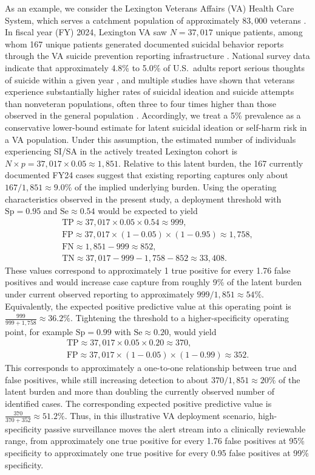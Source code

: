 \documentclass[onecolumn, compsoc,11pt]{IEEEtran}
\def\EQSP{3pt}
\newcommand{\cgather}[2][\EQSP]{\begingroup\setlength\abovedisplayskip{#1}\setlength\belowdisplayskip{#1}\begin{gather} #2 \end{gather}\endgroup\noindent}
\begin{document}
As an example, we consider the Lexington Veterans Affairs (VA) Health Care System, which serves a catchment population of approximately $83{,}000$ veterans \cite{VA_Lexington_About}. In fiscal year (FY) 2024, Lexington VA saw $N = 37{,}017$ unique patients, among whom 167 unique patients generated documented suicidal behavior reports through the VA suicide prevention reporting infrastructure \cite{VA_VINCI_Lexington_2024}. National survey data indicate that approximately 4.8\% to 5.0\% of U.S.\ adults report serious thoughts of suicide within a given year \cite{SAMHSA_2023_NSduh}, and multiple studies have shown that veterans experience substantially higher rates of suicidal ideation and suicide attempts than nonveteran populations, often three to four times higher than those observed in the general population \cite{NHRVS_Suicide_Ideation,VA_Suicide_Report_2023}. Accordingly, we treat a 5\% prevalence as a conservative lower-bound estimate for latent suicidal ideation or self-harm risk in a VA population. Under this assumption, the estimated number of individuals experiencing SI/SA in the actively treated Lexington cohort is
$ N \times p = 37{,}017 \times 0.05 \approx 1{,}851.$ Relative to this latent burden, the 167 currently documented FY24 cases suggest that existing reporting captures only about $ 167/1{,}851 \approx 9.0\% $
of the implied underlying burden. Using the operating characteristics observed in the present study, a deployment threshold with $\mathrm{Sp}=0.95$ and $\mathrm{Se}\approx0.54$ would be expected to yield
\cgather{
\mathrm{TP} \approx 37{,}017 \times 0.05 \times 0.54 \approx 999,\\
\mathrm{FP} \approx 37{,}017 \times (1-0.05) \times (1-0.95) \approx 1{,}758,\\
\mathrm{FN} \approx 1{,}851 - 999 \approx 852,\\
\mathrm{TN} \approx 37{,}017 - 999 - 1{,}758 - 852 \approx 33{,}408.
}
These values correspond to approximately 1 true positive for every 1.76 false positives and would increase case capture from roughly 9\% of the latent burden under current observed reporting to approximately $ 999/1{,}851 \approx 54\%.$
Equivalently, the expected positive predictive value at this operating point is $\frac{999}{999+1{,}758} \approx 36.2\%.$
Tightening the threshold to a higher-specificity operating point, for example $\mathrm{Sp}=0.99$ with $\mathrm{Se}\approx0.20$, would yield
\cgather{
\mathrm{TP} \approx 37{,}017 \times 0.05 \times 0.20 \approx 370,\\
\mathrm{FP} \approx 37{,}017 \times (1-0.05) \times (1-0.99) \approx 352.
}
This corresponds to approximately a one-to-one relationship between true and false positives, while still increasing detection to about $ 370/1{,}851 \approx 20\%$ of the latent burden and more than doubling the currently observed number of identified cases. The corresponding expected positive predictive value is
$\frac{370}{370+352} \approx 51.2\%.$ Thus, in this illustrative VA deployment scenario, high-specificity passive surveillance moves the alert stream into a clinically reviewable range, from approximately one true positive for every 1.76 false positives at 95\% specificity to approximately one true positive for every 0.95 false positives at 99\% specificity.
\end{document}
